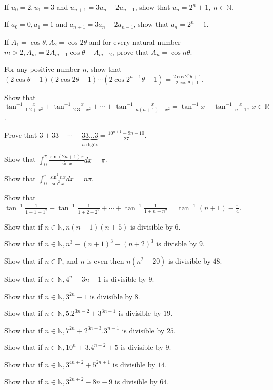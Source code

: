 \item If $u_0 = 2, u_1 = 3$ and $u_{n + 1} = 3u_n - 2u_{n - 1}$, show that $u_n = 2^n + 1,\;n\in \mathbb{N}$.
\item If $a_0 = 0, a_1 = 1$ and $a_{n + 1} = 3a_n - 2a_{n - 1}$, show that $a_n = 2^n - 1$.
\item If $A_1 = \cos\theta, A_2 = \cos2\theta$ and for every natural number $m > 2, A_m = 2A_{m-1}\cos\theta - A_{m - 2}$, prove
  that $A_n = \cos n\theta$.
\item For any positive number $n$, show that $(2\cos\theta - 1)(2\cos2\theta - 1)\cdots(2\cos2^{n - 1}\theta - 1) =
  \frac{2\cos2^n\theta + 1}{2\cos\theta + 1}$.
\item Show that $\tan^{-1}\frac{x}{1.2 + x^2} + \tan^{-1}\frac{x}{2.3 + x^2} + \cdots + \tan^{-1}\frac{x}{n(n + 1) + x^2} =
  \tan^{-1}x - \tan^{-1}\frac{x}{n + 1},\;x\in \mathbb{R}$.
\item Prove that $3 + 33 + \cdots + \underbrace{33\ldots3}_{n\text{~digits}} = \frac{10^{n + 1} - 9n - 10}{27}$.
\item Show that $\displaystyle\int_{0}^\pi\frac{\sin(2n + 1)x}{\sin x}dx = \pi$.
\item Show that $\displaystyle\int_{0}^\pi\frac{\sin^2nx}{\sin^2x}dx = n\pi$.
\item Show that $\tan^{-1}\frac{1}{1 + 1 + 1^2} + \tan^{-1}\frac{1}{1 + 2 + 2^2} + \cdots +
  \tan^{-1}\frac{1}{1 + n + n^2} = \tan^{-1}(n + 1) - \frac{\pi}{4}$.
\item Show that if $n\in\mathbb{N}, n(n + 1)(n + 5)$ is divisible by $6$.
\item Show that if $n\in\mathbb{N}, n^3 + (n + 1)^3 + (n + 2)^3$ is divisble by $9$.
\item Show that if $n\in\mathbb{P}$, and $n$ is even then $n(n^2 + 20)$ is divisible by $48$.
\item Show that if $n\in\mathbb{N}, 4^n - 3n - 1$ is divisible by $9$.
\item Show that if $n\in\mathbb{N}, 3^{2n} - 1$ is divisible by $8$.
\item Show that if $n\in\mathbb{N}, 5.2^{3n - 2} + 3^{3n - 1}$ is divisible by $19$.
\item Show that if $n\in\mathbb{N}, 7^{2n} + 2^{3n - 3}.3^{n - 1}$ is divisible by $25$.
\item Show that if $n\in\mathbb{N}, 10^n + 3.4^{n + 2} + 5$ is divisible by $9$.
\item Show that if $n\in\mathbb{N}, 3^{4n + 2} + 5^{2n + 1}$ is divisible by $14$.
\item Show that if $n\in\mathbb{N}, 3^{2n + 2} - 8n - 9$ is divisible by $64$.
